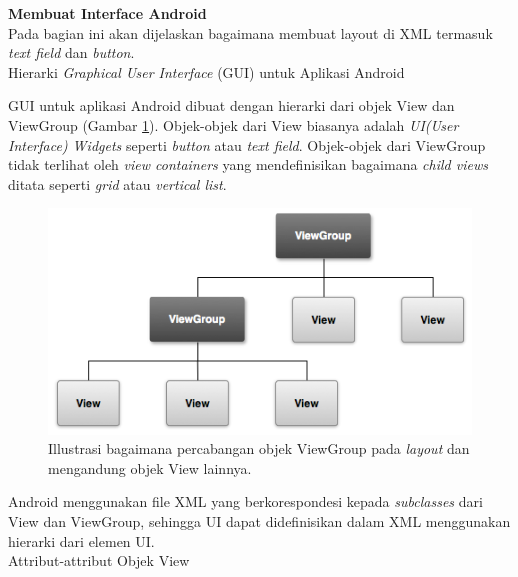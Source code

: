 \documentclass[a4paper,twoside]{article}
\begin{document}
\begin{enumerate}
				\textbf{Membuat Interface Android}\\
				
\cite{android_developers}
Pada bagian ini akan dijelaskan bagaimana membuat layout di XML termasuk \textit{text field} dan \textit{button}.\\

	 Hierarki \textit{Graphical User Interface} (GUI) untuk Aplikasi Android\\
		\label{sssec:hierarki_gui_untuk_aplikasi_android}
		
		GUI untuk aplikasi Android dibuat dengan hierarki dari objek View dan ViewGroup (Gambar \ref{fig:viewgroup}). Objek-objek dari View biasanya adalah \textit{UI(User Interface) Widgets} seperti \textit{button} atau \textit{text field}. Objek-objek dari ViewGroup tidak terlihat oleh \textit{view containers} yang mendefinisikan bagaimana \textit{child views} ditata seperti \textit{grid} atau \textit{vertical list}.

		\begin{figure}[htbp]
			\centering
				\includegraphics[scale=1]{Gambar/viewgroup.png}
			\caption{Illustrasi bagaimana percabangan objek ViewGroup pada \textit{layout} dan mengandung objek View lainnya.}
			\label{fig:viewgroup}
		\end{figure}

		Android menggunakan file XML yang berkorespondesi kepada \textit{subclasses} dari View dan ViewGroup, sehingga UI dapat didefinisikan dalam XML menggunakan hierarki dari elemen UI.\\

 Attribut-attribut Objek View\\


\end{enumerate}
\end{document}
